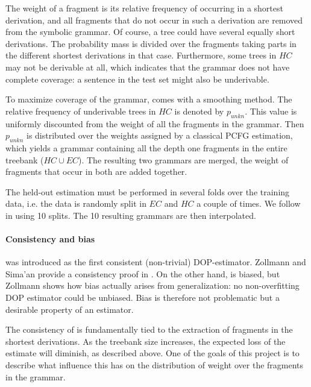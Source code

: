 The weight of a fragment is its relative frequency of occurring in a shortest derivation, and all fragments that do not occur in such a derivation are removed from the symbolic grammar. 
Of course, a tree could have several equally short derivations. The probability mass is divided over the fragments taking parts in the different shortest derivations in that case. Furthermore, some trees in $HC$ may not be derivable at all, which indicates that the grammar does not have complete coverage: a sentence in the test set might also be underivable. 

To maximize coverage of the grammar, \dops{} comes with a smoothing method. The relative frequency of underivable trees in $HC$ is denoted by $p_{unkn}$. This value is uniformly discounted from the weight of all the fragments in the grammar. Then $p_{unkn}$ is distributed over the weights assigned by a classical PCFG estimation, which yields a grammar containing all the depth one fragments in the entire treebank ($HC\cup EC$). The resulting two grammars are merged, the weight of fragments that occur in both are added together.

The held-out estimation must be performed in several folds over the training data, i.e. the data is randomly split in $EC$ and $HC$ a couple of times. We follow \cite{zollman2005} in using 10 splits. The 10 resulting grammars are then interpolated.

\paragraph{Consistency and bias}
\dops{} was introduced as the first consistent (non-trivial) DOP-estimator. Zollmann and Sima'an provide a consistency proof in . On the other hand, \dops{} is  biased, but Zollmann shows how bias actually arises from generalization: no non-overfitting DOP estimator could be unbiased. Bias is therefore not problematic but a desirable property of an estimator.

The consistency of \dops{} is fundamentally tied to the extraction of fragments in the shortest derivations. As the treebank size increases, the expected loss of the estimate will diminish, as described above. One of the goals of this project is to describe what influence this has on the distribution of weight over the fragments in the grammar.

